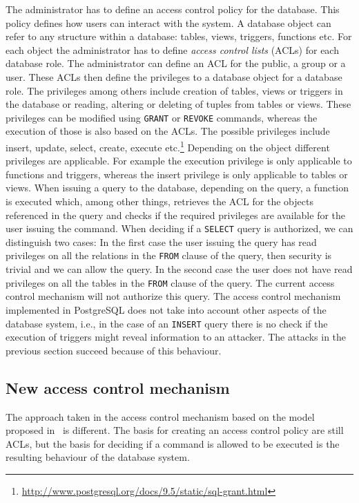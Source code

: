 The administrator has to define an access control policy for the database.
%
This policy defines how users can interact with the system.
%
A database object can refer to any structure within a database: tables, views, triggers, functions etc.
%
For each object the administrator has to define \emph{access control lists} (ACLs) for each database role.
%
The administrator can define an ACL for the public, a group or a user. 
%
These ACLs then define the privileges to a database object for a database role.
%
The privileges among others include creation of tables, views or triggers in the database or reading, altering or deleting of tuples from tables or views.
%
These privileges can be modified using \texttt{GRANT} or \texttt{REVOKE} commands, whereas the execution of those is also based on the ACLs.
%
The possible privileges include insert, update, select, create, execute etc.\footnote{\url{http://www.postgresql.org/docs/9.5/static/sql-grant.html}}
%
Depending on the object different privileges are applicable. For example the execution privilege is only applicable to functions and triggers, whereas the insert privilege is only applicable to tables or views.
%
When issuing a query to the database, depending on the query, a function is executed which, among other things, retrieves the ACL for the objects referenced in the query and checks if the required privileges are available for the user issuing the command.
%
When deciding if a \texttt{SELECT} query is authorized, we can distinguish two cases: 
%
In the first case the user issuing the query has read privileges on all the relations in the \texttt{FROM} clause of the query, then security is trivial and we can allow the query. 
%
In the second case the user does not have read privileges on all the tables in the \texttt{FROM} clause of the query. 
%
The current access control mechanism will not authorize this query.
%
The access control mechanism implemented in PostgreSQL does not take into account other aspects of the database system, i.e., in the case of an \texttt{INSERT} query there is no check if the execution of triggers might reveal information to an attacker.
%
The attacks in the previous section succeed because of this behaviour.
%
%
\subsection{New access control mechanism}
%
The approach taken in the access control mechanism based on the model proposed in~\cite{guarnieri2016strong} is different.
%
The basis for creating an access control policy are still ACLs, but the basis for deciding if a command is allowed to be executed is the resulting behaviour of the database system.

